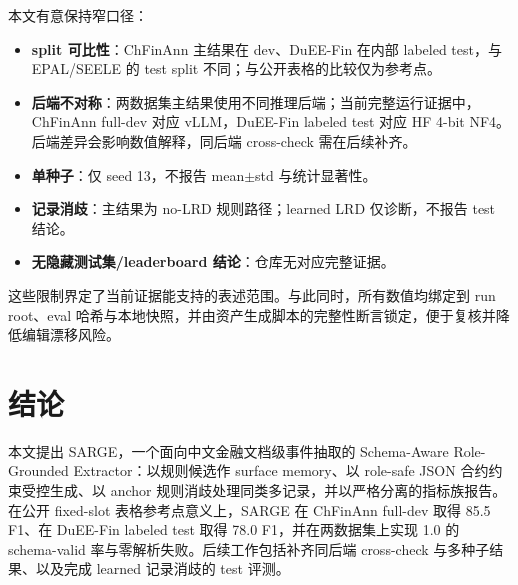 \documentclass[UTF8,fontset=none,11pt]{ctexart}
\begin{document}
本文有意保持窄口径：
\begin{itemize}
  \item \textbf{split 可比性}：ChFinAnn 主结果在 dev、DuEE-Fin 在内部 labeled test，与 EPAL/SEELE 的 test split 不同；与公开表格的比较仅为参考点。
  \item \textbf{后端不对称}：两数据集主结果使用不同推理后端；当前完整运行证据中，ChFinAnn full-dev 对应 vLLM，DuEE-Fin labeled test 对应 HF 4-bit NF4。后端差异会影响数值解释，同后端 cross-check 需在后续补齐。
  \item \textbf{单种子}：仅 seed 13，不报告 mean$\pm$std 与统计显著性。
  \item \textbf{记录消歧}：主结果为 no-LRD 规则路径；learned LRD 仅诊断，不报告 test 结论。
  \item \textbf{无隐藏测试集/leaderboard 结论}：仓库无对应完整证据。
\end{itemize}
这些限制界定了当前证据能支持的表述范围。与此同时，所有数值均绑定到 run root、eval 哈希与本地快照，并由资产生成脚本的完整性断言锁定，便于复核并降低编辑漂移风险。

\section{结论}

本文提出 SARGE，一个面向中文金融文档级事件抽取的 Schema-Aware Role-Grounded Extractor：以规则候选作 surface memory、以 role-safe JSON 合约约束受控生成、以 anchor 规则消歧处理同类多记录，并以严格分离的指标族报告。在公开 fixed-slot 表格参考点意义上，SARGE 在 ChFinAnn full-dev 取得 85.5 F1、在 DuEE-Fin labeled test 取得 78.0 F1，并在两数据集上实现 1.0 的 schema-valid 率与零解析失败。后续工作包括补齐同后端 cross-check 与多种子结果、以及完成 learned 记录消歧的 test 评测。
\end{document}
